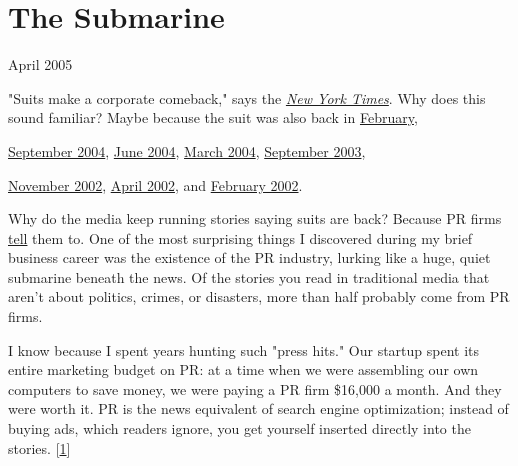 \chapter{The Submarine}


            
              
                

April 2005

"Suits make a corporate comeback," says
                  the
                  \href{http://www.nytimes.com/2005/04/14/fashion/thursdaystyles/14peacock.html?ex=1271131200\&en=e96f2670387e3636\&ei=5090\&partner=rssuserland}{\emph{New York Times}}. Why does this sound familiar? Maybe because the suit was
                  also back in
                  \href{http://www.cvbizlink.com/articles/2005/04/07/news/news/doc42406f05edf53293947237.prt}{February},
                  
                  \href{http://www.usatoday.com/money/industries/retail/2004-09-01-suits\_x.htm}{September 2004},
                  \href{http://www.cnn.com/2004/BUSINESS/06/23/go.fashion.jones/}{June 2004},
                  \href{http://www.post-gazette.com/pg/04062/279616.stm}{March 2004},
                  \href{http://www.southcoasttoday.com/daily/09-03/09-21-03/c01li238.htm}{September 2003},
                  
                  \href{http://www.businessweek.com/magazine/content/02\_46/b3808122.htm}{November 2002},
                  \href{http://www.pittsburghlive.com/x/s\_65540.html}{April 2002}, and
                  \href{http://news.bbc.co.uk/1/hi/business/1836010.stm}{February 2002}.
                  
                  

Why
                  do the media keep running stories saying suits are back?
                  Because PR firms
                  \href{http://www.maximumexposurepr.com/middleMAA.html}{tell}
                  them to. One of the most surprising things I discovered during
                  my brief business career was the existence of the PR industry,
                  lurking like a huge, quiet submarine beneath the news. Of the
                  stories you read in traditional media that aren't about
                  politics, crimes, or disasters, more than half probably come
                  from PR firms.

I know because I spent years hunting
                  such "press hits." Our startup spent its entire marketing
                  budget on PR: at a time when we were assembling our own
                  computers to save money, we were paying a PR firm \$16,000 a
                  month. And they were worth it. PR is the news equivalent of
                  search engine optimization; instead of buying ads, which
                  readers ignore, you get yourself inserted directly into the
                  stories.
                  [\href{\#f1n}{1}]

